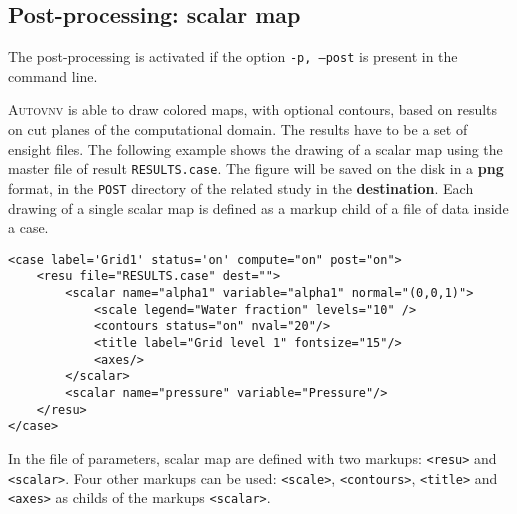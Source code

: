 \documentclass[a4paper,10pt,twoside]{csshortdoc}
\begin{document}
\subsection{Post-processing: scalar map}

The post-processing is activated if the option \texttt{-p, --post} is present
in the command line.

\textsc{Autovnv} is able to draw colored maps, with optional contours, based on
results on cut planes of the computational domain. The results have to be a set of
ensight files. The following example shows the drawing of a scalar map using the
master file of result \texttt{RESULTS.case}. The figure will be saved on the
disk in a \textbf{png} format, in the \texttt{POST} directory of the related
study in the \textbf{destination}. Each drawing of a single scalar map is
defined as a markup child of a file of data inside a case.

\small
\begin{verbatim}
<case label='Grid1' status='on' compute="on" post="on">
    <resu file="RESULTS.case" dest="">
        <scalar name="alpha1" variable="alpha1" normal="(0,0,1)">
            <scale legend="Water fraction" levels="10" />
            <contours status="on" nval="20"/>
            <title label="Grid level 1" fontsize="15"/>
            <axes/>
        </scalar>
        <scalar name="pressure" variable="Pressure"/>
    </resu>
</case>
\end{verbatim}
\normalsize

In the file of parameters, scalar map are defined with two markups:
\texttt{<resu>} and \texttt{<scalar>}. Four other markups can be used:
\texttt{<scale>}, \texttt{<contours>}, \texttt{<title>} and \texttt{<axes>} as
childs of the markups \texttt{<scalar>}.
\end{document}
